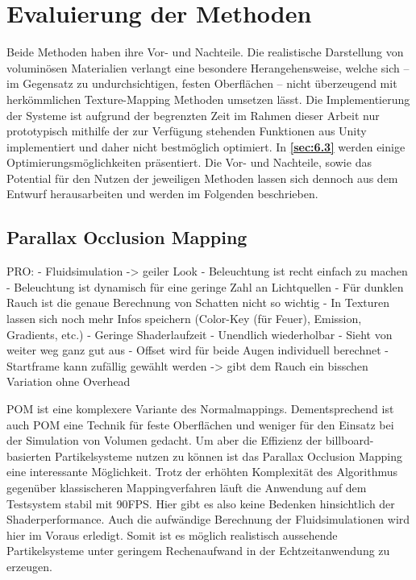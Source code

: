 \section{Evaluierung der Methoden}
\label{sec:5}

Beide Methoden haben ihre Vor- und Nachteile. Die realistische Darstellung von voluminösen Materialien verlangt 
eine besondere Herangehensweise, welche sich – im Gegensatz zu undurchsichtigen, festen Oberflächen – 
nicht überzeugend mit herkömmlichen Texture-Mapping Methoden umsetzen lässt. 
Die Implementierung der Systeme ist aufgrund der begrenzten Zeit im Rahmen dieser Arbeit nur prototypisch mithilfe der 
zur Verfügung stehenden Funktionen aus Unity implementiert und daher nicht bestmöglich optimiert. 
In \textbf{\autoref{sec:6.3}} werden einige Optimierungsmöglichkeiten präsentiert. 
Die Vor- und Nachteile, sowie das Potential für den Nutzen der jeweiligen Methoden lassen sich dennoch aus dem Entwurf 
herausarbeiten und werden im Folgenden beschrieben.


\subsection{Parallax Occlusion Mapping}
\label{sec:5.1}

PRO: \newline
- Fluidsimulation -> geiler Look\newline
- Beleuchtung ist recht einfach zu machen \newline
- Beleuchtung ist dynamisch für eine geringe Zahl an Lichtquellen
- Für dunklen Rauch ist die genaue Berechnung von Schatten nicht so wichtig
- In Texturen lassen sich noch mehr Infos speichern (Color-Key (für Feuer), Emission, Gradients, etc.) \newline
- Geringe Shaderlaufzeit\newline
- Unendlich wiederholbar\newline
- Sieht von weiter weg ganz gut aus\newline
- Offset wird für beide Augen individuell berechnet\newline
- Startframe kann zufällig gewählt werden -> gibt dem Rauch ein bisschen Variation ohne Overhead


POM ist eine komplexere Variante des Normalmappings. Dementsprechend ist auch POM eine Technik für feste Oberflächen und weniger
für den Einsatz bei der Simulation von Volumen gedacht. Um aber die Effizienz der billboard-basierten Partikelsysteme 
nutzen zu können ist das Parallax Occlusion Mapping eine interessante Möglichkeit. Trotz der erhöhten Komplexität des Algorithmus
gegenüber klassischeren Mappingverfahren läuft die Anwendung auf dem Testsystem stabil mit 90FPS. Hier gibt es also keine 
Bedenken hinsichtlich der Shaderperformance. Auch die aufwändige Berechnung der Fluidsimulationen wird hier im Voraus erledigt. Somit
ist es möglich realistisch aussehende Partikelsysteme unter geringem Rechenaufwand in der Echtzeitanwendung zu erzeugen.
 

